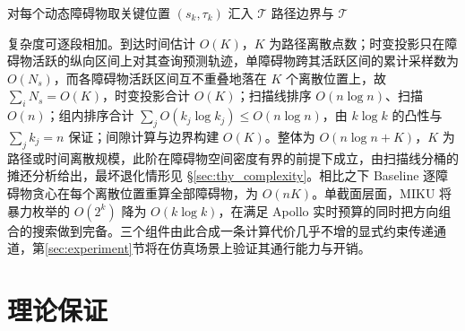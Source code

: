 \documentclass[a4paper,11pt]{ctexart}
\theoremstyle{definition}
\begin{document}
\begin{algorithm}[htbp]
\caption{MIKU 多障碍物统一规划求解}
\label{alg:miku}
对每个动态障碍物取关键位置 $(s_k, \tau_k)$ 汇入 $\mathcal{T}$\;
\KwRet 路径边界与 $\mathcal{T}$
\end{algorithm}

复杂度可逐段相加。到达时间估计 $O(K)$，$K$ 为路径离散点数；时变投影只在障碍物活跃的纵向区间上对其查询预测轨迹，单障碍物跨其活跃区间的累计采样数为 $O(N_s)$，而各障碍物活跃区间互不重叠地落在 $K$ 个离散位置上，故 $\sum_i N_s = O(K)$，时变投影合计 $O(K)$；扫描线排序 $O(n\log n)$、扫描 $O(n)$；组内排序合计 $\sum_j O(k_j\log k_j)\leq O(n\log n)$，由 $k\log k$ 的凸性与 $\sum_j k_j = n$ 保证；间隙计算与边界构建 $O(K)$。整体为 $O(n\log n + K)$，$K$ 为路径或时间离散规模，此阶在障碍物空间密度有界的前提下成立，由扫描线分桶的摊还分析给出，最坏退化情形见 §\ref{sec:thy_complexity}。相比之下 Baseline 逐障碍物贪心在每个离散位置重算全部障碍物，为 $O(nK)$。单截面层面，MIKU 将暴力枚举的 $O(2^k)$ 降为 $O(k\log k)$，在满足 Apollo 实时预算的同时把方向组合的搜索做到完备。三个组件由此合成一条计算代价几乎不增的显式约束传递通道，第\ref{sec:experiment}节将在仿真场景上验证其通行能力与开销。

\makeatletter
{}
\makeatother

\section{理论保证}
\label{sec:theory}
\end{document}

